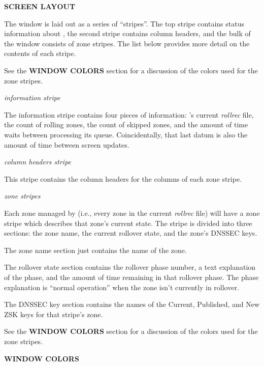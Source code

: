 {\bf SCREEN LAYOUT}

The  window is laid out as a series of ``stripes''.  The top
stripe contains status information about , the second stripe
contains column headers, and the bulk of the window consists of zone stripes.
The list below provides more detail on the contents of each stripe.

See the {\bf WINDOW COLORS} section for a discussion of the colors used for
the zone stripes.

\begin{description}

\item {\it {} information stripe}\verb" "

The information stripe contains four pieces of information:  's
current {\it rollrec} file, the count of rolling zones, the count of skipped
zones, and the amount of time  waits between processing its queue.
Coincidentally, that last datum is also the amount of time between
 screen updates.

\item {\it column headers stripe}

This stripe contains the column headers for the columns of each zone stripe.

\item {\it zone stripes}

Each zone managed by  (i.e., every zone in the current {\it
rollrec} file) will have a zone stripe which describes that zone's current
state.  The stripe is divided into three sections:  the zone name, the current
rollover state, and the zone's DNSSEC keys.

The zone name section just contains the name of the zone.

The rollover state section contains the rollover phase number, a text
explanation of the phase, and the amount of time remaining in that rollover
phase.  The phase explanation is ``normal operation'' when the zone isn't
currently in rollover.

The DNSSEC key section contains the names of the Current, Published, and New
ZSK keys for that stripe's zone.

See the {\bf WINDOW COLORS} section for a discussion of the colors used for
the zone stripes.

\end{description}

{\bf WINDOW COLORS}

